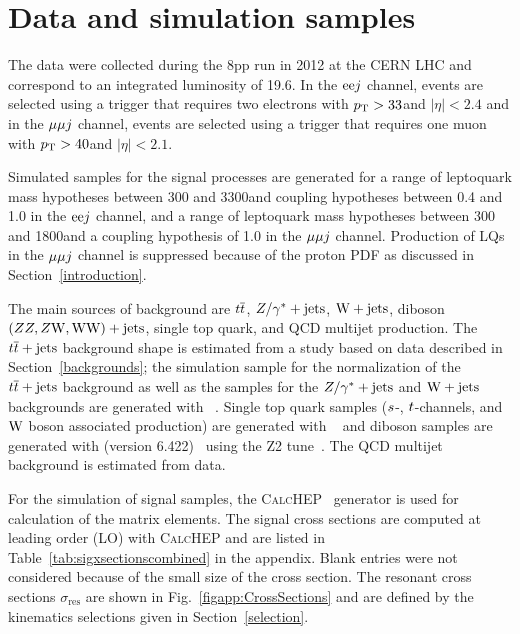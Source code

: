 \section{Data and simulation samples}
\label{samples}

The data were collected during the 8\TeV pp run in 2012 at the CERN LHC and correspond to an integrated luminosity of 19.6\fbinv.  In the $\mathrm{e} \mathrm{e} j$ channel, events are selected using a trigger that requires two electrons with $p_{\mathrm{T}} > 33$\GeV and $|\eta| < 2.4$ and in the ${\mu} {\mu} j$ channel, events are selected using a trigger that requires one muon with $p_{\mathrm{T}} > 40$\GeV and $|\eta| < 2.1$.

Simulated samples for the signal processes are generated for a range of leptoquark mass hypotheses between 300 and 3300\GeV and coupling hypotheses between 0.4 and 1.0 in the $\mathrm{e} \mathrm{e} j$ channel, and a range of leptoquark mass hypotheses between 300 and 1800\GeV and a coupling hypothesis of 1.0 in the ${\mu} {\mu} j$ channel.  Production of LQs in the ${\mu} {\mu} j$ channel is suppressed because of the proton PDF as discussed in Section~\ref{introduction}.

The main sources of background are $\relax{t}\overline{\relax{t}}$, $\relax{Z}/\gamma^* + {\rm jets}$, $\mathrm{W} + {\rm jets}$, diboson $(\relax{Z}\relax{Z} , \relax{Z}\mathrm{W}, \mathrm{W}\mathrm{W}) + {\rm jets}$, single top quark, and QCD multijet production.  The $\relax{t}\overline{\relax{t}} + {\rm jets}$ background shape is estimated from a study based on data described in Section~\ref{backgrounds}; the simulation sample for the normalization of the $\relax{t}\overline{\relax{t}} + {\rm jets}$ background as well as the samples for the $\relax{Z}/\gamma^* + {\rm jets}$ and $\mathrm{W} + {\rm jets}$ backgrounds are generated with ~\cite{MadGraph}.  Single top quark samples ($\relax{s}$-, $\relax{t}$-channels, and $\mathrm{W}$ boson associated production) are generated with ~\cite{POWHEG,Alioli:2009je,Frixione:2007vw,Nason:2004rx} and diboson samples are generated with \PYTHIA (version 6.422)~\cite{PYTHIA} using the Z2 tune~\cite{tunez2}.  The QCD multijet background is estimated from data.  

For the simulation of signal samples, the {{\textsc{CalcHEP}}\xspace}~\cite{hepmdb} generator is used for calculation of the matrix elements. The signal cross sections are computed at leading order (LO) with {{\textsc{CalcHEP}}\xspace} and are listed in Table~\ref{tab:sigxsectionscombined} in the appendix.  Blank entries were not considered because of the small size of the cross section. The resonant cross sections $\sigma_{\text{res}}$ are shown in Fig.~\ref{figapp:CrossSections} and are defined by the kinematics selections given in Section~\ref{selection}.

